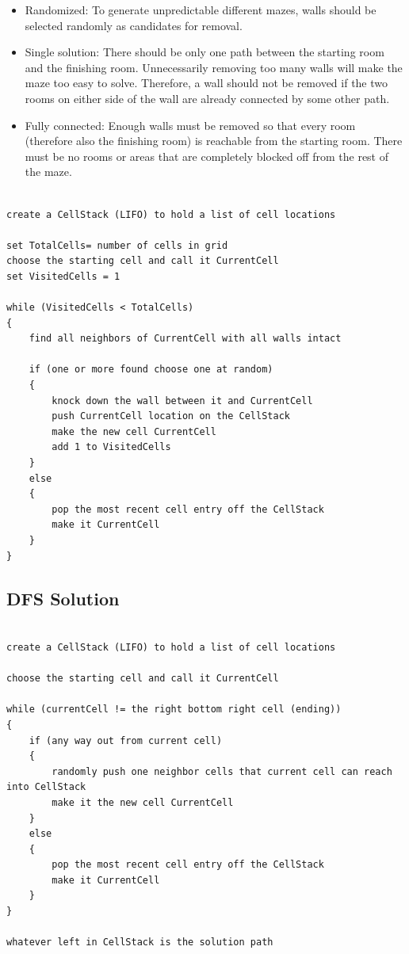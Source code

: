 \documentclass{article}
\begin{document}
\begin{itemize}

\item Randomized: To generate unpredictable different mazes, walls should be selected randomly as candidates for removal.
\item Single solution: There should be only one path between the starting room and the finishing room. Unnecessarily removing too many walls will make the maze too easy to solve. Therefore, a wall should not be removed if the two rooms on either side of the wall are already connected by some other path.
\item Fully connected: Enough walls must be removed so that every room (therefore also the finishing room) is reachable from the starting room. There must be no rooms or areas that are completely blocked off from the rest of the maze.

\end{itemize}

\begin{lstlisting}

create a CellStack (LIFO) to hold a list of cell locations

set TotalCells= number of cells in grid
choose the starting cell and call it CurrentCell
set VisitedCells = 1

while (VisitedCells < TotalCells)
{
	find all neighbors of CurrentCell with all walls intact
	
	if (one or more found choose one at random)
	{
		knock down the wall between it and CurrentCell
		push CurrentCell location on the CellStack
		make the new cell CurrentCell
		add 1 to VisitedCells
	}
	else
	{
		pop the most recent cell entry off the CellStack
		make it CurrentCell
	}
}

\end{lstlisting}

\subsection*{DFS Solution}
\begin{lstlisting}

create a CellStack (LIFO) to hold a list of cell locations

choose the starting cell and call it CurrentCell

while (currentCell != the right bottom right cell (ending))
{
	if (any way out from current cell)
	{
		randomly push one neighbor cells that current cell can reach into CellStack
		make it the new cell CurrentCell
	}
	else
	{
		pop the most recent cell entry off the CellStack
		make it CurrentCell
	}
}

whatever left in CellStack is the solution path

\end{lstlisting}
\end{document}

